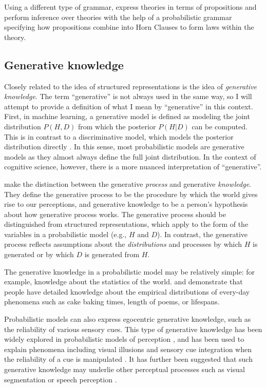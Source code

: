 \documentclass[12pt]{article}
\begin{document}
Using a different type of grammar, \cite{Ullman2012} express theories in terms of propositions and perform inference over theories with the help of a probabilistic grammar specifying how propositions combine into Horn Clauses to form laws within the theory.

\subsection*{Generative knowledge}

Closely related to the idea of structured representations is the idea of \textit{generative knowledge}. The term ``generative'' is not always used in the same way, so I will attempt to provide a definition of what I mean by ``generative'' in this context. First, in machine learning, a generative model is defined as modeling the joint distribution $P(H,D)$ from which the posterior $P(H|D)$ can be computed. This is in contrast to a discriminative model, which models the posterior distribution directly \citep{Ng2002}. In this sense, most probabilistic models are generative models as they almost always define the full joint distribution. In the context of cognitive science, however, there is a more nuanced interpretation of ``generative''.

\cite{Battaglia2012} make the distinction between the generative \textit{process} and generative \textit{knowledge}. They define the generative process to be the procedure by which the world gives rise to our perceptions, and generative knowledge to be a person's hypothesis about how generative process works. The generative process should be distinguished from structured representations, which apply to the form of the variables in a probabilistic model (e.g., $H$ and $D$). In contrast, the generative process reflects assumptions about the \textit{distributions} and processes by which $H$ is generated or by which $D$ is generated from $H$.

The generative knowledge in a probabilistic model may be relatively simple: for example, knowledge about the statistics of the world. \cite{Griffiths2006} and \cite{Lewandowsky2009} demonstrate that people have detailed knowledge about the empirical distributions of every-day phenomena such as cake baking times, length of poems, or lifespans.

Probabilistic models can also express egocentric generative knowledge, such as the reliability of various sensory cues. This type of generative knowledge has been widely explored in probabilistic models of perception \citep{Battaglia2012}, and has been used to explain phenomena including visual illusions \citep{Weiss2002} and sensory cue integration when the reliability of a cue is manipulated \citep{Ernst2002}. It has further been suggested that such generative knowledge may underlie other perceptual processes such as visual segmentation \citep{Yuille2006} or speech perception \citep{Halle1959,Halle1962,Bever2010}.
\end{document}
